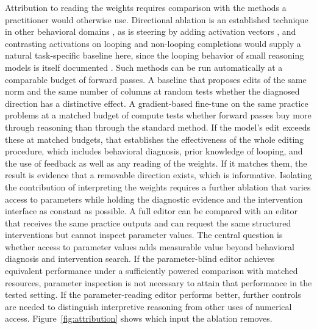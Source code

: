 \documentclass[11pt]{article}
\begin{document}
Attribution to reading the weights requires comparison with the methods a practitioner would otherwise use. Directional ablation is an established technique in other behavioral domains \cite{arditi2024}, as is steering by adding activation vectors \cite{turner2023}, and contrasting activations on looping and non-looping completions would supply a natural task-specific baseline here, since the looping behavior of small reasoning models is itself documented \cite{pipis2025}. Such methods can be run automatically at a comparable budget of forward passes. A baseline that proposes edits of the same norm and the same number of columns at random tests whether the diagnosed direction has a distinctive effect. A gradient-based fine-tune on the same practice problems at a matched budget of compute tests whether forward passes buy more through reasoning than through the standard method. If the model's edit exceeds these at matched budgets, that establishes the effectiveness of the whole editing procedure, which includes behavioral diagnosis, prior knowledge of looping, and the use of feedback as well as any reading of the weights. If it matches them, the result is evidence that a removable direction exists, which is informative. Isolating the contribution of interpreting the weights requires a further ablation that varies access to parameters while holding the diagnostic evidence and the intervention interface as constant as possible. A full editor can be compared with an editor that receives the same practice outputs and can request the same structured interventions but cannot inspect parameter values. The central question is whether access to parameter values adds measurable value beyond behavioral diagnosis and intervention search. If the parameter-blind editor achieves equivalent performance under a sufficiently powered comparison with matched resources, parameter inspection is not necessary to attain that performance in the tested setting. If the parameter-reading editor performs better, further controls are needed to distinguish interpretive reasoning from other uses of numerical access. Figure~\ref{fig:attribution} shows which input the ablation removes.
\end{document}
